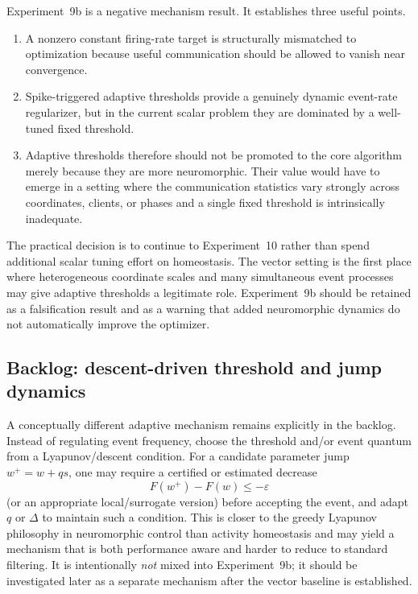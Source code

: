 Experiment~9b is a negative mechanism result. It establishes three useful points.
\begin{enumerate}
  \item A nonzero constant firing-rate target is structurally mismatched to optimization because useful communication should be allowed to vanish near convergence.
  \item Spike-triggered adaptive thresholds provide a genuinely dynamic event-rate regularizer, but in the current scalar problem they are dominated by a well-tuned fixed threshold.
  \item Adaptive thresholds therefore should not be promoted to the core algorithm merely because they are more neuromorphic. Their value would have to emerge in a setting where the communication statistics vary strongly across coordinates, clients, or phases and a single fixed threshold is intrinsically inadequate.
\end{enumerate}

The practical decision is to continue to Experiment~10 rather than spend additional scalar tuning effort on homeostasis. The vector setting is the first place where heterogeneous coordinate scales and many simultaneous event processes may give adaptive thresholds a legitimate role. Experiment~9b should be retained as a falsification result and as a warning that added neuromorphic dynamics do not automatically improve the optimizer.

\subsection{Backlog: descent-driven threshold and jump dynamics}

A conceptually different adaptive mechanism remains explicitly in the backlog. Instead of regulating event frequency, choose the threshold and/or event quantum from a Lyapunov/descent condition. For a candidate parameter jump $w^+=w+qs$, one may require a certified or estimated decrease
\begin{equation}
  F(w^+)-F(w)\leq -\varepsilon
\end{equation}
(or an appropriate local/surrogate version) before accepting the event, and adapt $q$ or $\Delta$ to maintain such a condition. This is closer to the greedy Lyapunov philosophy in neuromorphic control than activity homeostasis and may yield a mechanism that is both performance aware and harder to reduce to standard filtering. It is intentionally \emph{not} mixed into Experiment~9b; it should be investigated later as a separate mechanism after the vector baseline is established.
